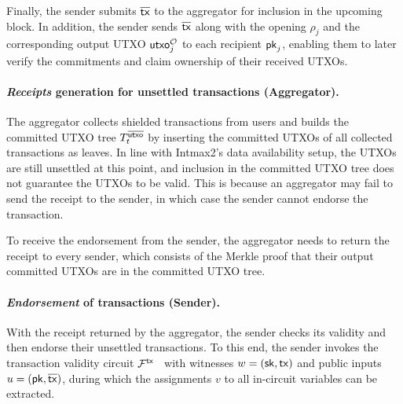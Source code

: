 Finally, the sender submits $\overline{\mathsf{tx}}$ to the aggregator for inclusion in the upcoming block.
In addition, the sender sends $\overline{\mathsf{tx}}$ along with the opening $\rho_j$ and the corresponding output \ac{UTXO} $\mathsf{utxo}^\mathcal{O}_j$ to each recipient ${\mathsf{pk}}_j$, enabling them to later verify the commitments and claim ownership of their received \acp{UTXO}.

\paragraph{\textit{Receipts} generation for unsettled transactions (Aggregator).}
The aggregator collects shielded transactions from users and builds the committed \ac{UTXO} tree $T^{\overline{\mathsf{utxo}}}_{t}$ by inserting the committed \acp{UTXO} of all collected transactions as leaves.
In line with Intmax2's data availability setup, the \acp{UTXO} are still unsettled at this point, and inclusion in the committed \ac{UTXO} tree does not guarantee the \acp{UTXO} to be valid.
This is because an aggregator may fail to send the receipt to the sender, in which case the sender cannot endorse the transaction.

To receive the endorsement from the sender, the aggregator needs to return the receipt to every sender, which consists of the Merkle proof that their output committed \acp{UTXO} are in the committed \ac{UTXO} tree.

\paragraph{\textit{Endorsement} of transactions (Sender).}
With the receipt returned by the aggregator, the sender checks its validity and then endorse their unsettled transactions.
To this end, the sender invokes the transaction validity circuit $\mathcal{F}^\mathsf{tx}$~ with witnesses $w = ({\mathsf{sk}}, \mathsf{tx})$ and public inputs $u = ({\mathsf{pk}}, \overline{\mathsf{tx}})$, during which the assignments $v$ to all in-circuit variables can be extracted.

